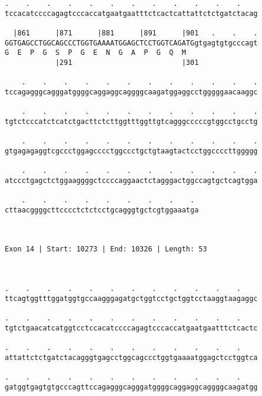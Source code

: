 \documentclass{article}
\begin{document}
\begin{Verbatim}
.    .    .    .    .    .    .    .    .    .    .    .    
tccacatccccagagtcccaccatgaatgaatttctcactcattattctctgatctacag
                                                            
  |861      |871      |881      |891      |901   .    .    .
GGTGAGCCTGGCAGCCCTGGTGAAAATGGAGCTCCTGGTCAGATGgtgagtgtgcccagt
G  E  P  G  S  P  G  E  N  G  A  P  G  Q  M                 
            |291                          |301              
  
    .    .    .    .    .    .    .    .    .    .    .    .
tccagagggcagggatggggcaggaggcaggggcaagatggaggcctgggggaacaaggc
                                                            
    .    .    .    .    .    .    .    .    .    .    .    .
tgtctcccatctcatctgacttctcttggtttggttgtcagggcccccgtggcctgcctg
                                                            
    .    .    .    .    .    .    .    .    .    .    .    .
gtgagagaggtcgccctggagcccctggccctgctgtaagtactcctggccccttggggg
                                                            
    .    .    .    .    .    .    .    .    .    .    .    .
atccctgagctctggaaggggctccccaggaactctagggactggccagtgctcagtgga
                                                            
    .    .    .    .    .    .    .    .    . 
cttaacggggcttcccctctctcctgcagggtgctcgtggaaatga
                                              
                                              
 
Exon 14 | Start: 10273 | End: 10326 | Length: 53



.    .    .    .    .    .    .    .    .    .    .    .    
ttcagtggtttggatggtgccaagggagatgctggtcctgctggtcctaaggtaagaggc
                                                            
.    .    .    .    .    .    .    .    .    .    .    .    
tgtctgaacatcatggtcctccacatccccagagtcccaccatgaatgaatttctcactc
                                                            
.    .    .    .    .    .    .    .    .    .    .    .    
attattctctgatctacagggtgagcctggcagccctggtgaaaatggagctcctggtca
                                                            
.    .    .    .    .    .    .    .    .    .    .    .    
gatggtgagtgtgcccagttccagagggcagggatggggcaggaggcaggggcaagatgg
                                                            

\end{Verbatim}
\end{document}
